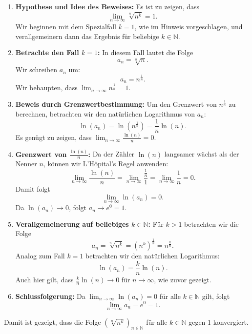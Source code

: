 \documentclass[11pt]{article}
\begin{document}
\begin{enumerate}
    \item \textbf{Hypothese und Idee des Beweises:} Es ist zu zeigen, dass
    \[
    \lim_{n \to \infty} \sqrt[n]{n^k} = 1.
    \]
    Wir beginnen mit dem Spezialfall \( k = 1 \), wie im Hinweis vorgeschlagen, und verallgemeinern dann das Ergebnis für beliebige \( k \in \mathbb{N} \).

    \item \textbf{Betrachte den Fall \( k = 1 \):} In diesem Fall lautet die Folge
    \[
    a_n = \sqrt[n]{n}.
    \]
    Wir schreiben \( a_n \) um:
    \[
    a_n = n^{\frac{1}{n}}.
    \]
    Wir behaupten, dass \( \lim_{n \to \infty} n^{\frac{1}{n}} = 1 \).

    \item \textbf{Beweis durch Grenzwertbestimmung:} Um den Grenzwert von \( n^{\frac{1}{n}} \) zu berechnen, betrachten wir den natürlichen Logarithmus von \( a_n \):
    \[
    \ln(a_n) = \ln\left(n^{\frac{1}{n}}\right) = \frac{1}{n} \ln(n).
    \]
    Es genügt zu zeigen, dass \( \lim_{n \to \infty} \frac{\ln(n)}{n} = 0 \).

    \item \textbf{Grenzwert von \( \frac{\ln(n)}{n} \):} Da der Zähler \( \ln(n) \) langsamer wächst als der Nenner \( n \), können wir L'Hôpital's Regel anwenden:
    \[
    \lim_{n \to \infty} \frac{\ln(n)}{n} = \lim_{n \to \infty} \frac{\frac{1}{n}}{1} = \lim_{n \to \infty} \frac{1}{n} = 0.
    \]
    Damit folgt
    \[
    \lim_{n \to \infty} \ln(a_n) = 0.
    \]
    Da \( \ln(a_n) \to 0 \), folgt \( a_n \to e^0 = 1 \).

    \item \textbf{Verallgemeinerung auf beliebiges \( k \in \mathbb{N} \):} Für \( k > 1 \) betrachten wir die Folge
    \[
    a_n = \sqrt[n]{n^k} = (n^k)^{\frac{1}{n}} = n^{\frac{k}{n}}.
    \]
    Analog zum Fall \( k = 1 \) betrachten wir den natürlichen Logarithmus:
    \[
    \ln(a_n) = \frac{k}{n} \ln(n).
    \]
    Auch hier gilt, dass \( \frac{k}{n} \ln(n) \to 0 \) für \( n \to \infty \), wie zuvor gezeigt.

    \item \textbf{Schlussfolgerung:} Da \( \lim_{n \to \infty} \ln(a_n) = 0 \) für alle \( k \in \mathbb{N} \) gilt, folgt
    \[
    \lim_{n \to \infty} a_n = e^0 = 1.
    \]
\end{enumerate}

Damit ist gezeigt, dass die Folge \( \left( \sqrt[n]{n^k} \right)_{n \in \mathbb{N}} \) für alle \( k \in \mathbb{N} \) gegen 1 konvergiert.
\end{document}
